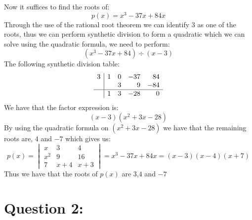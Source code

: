\documentclass{article}
\begin{document}
Now it suffices to find the roots of: $$p(x)=x^{3}-37x+84x$$
Through the use of the rational root theorem we can identify $3$ as one of the roots, thus we can perform synthetic division to form a quadratic which we can solve using the quadratic formula, we need to perform: $$(x^{3}-37x+84) \div (x-3)$$
The following synthetic division table: 
$$\begin{array}{r|rrrr}
3 & 1 & 0 & -37 & 84 \\
  &   & 3 & 9    & -84 \\
\hline
  & 1 & 3 & -28  & 0 \\
\end{array}$$
We have that the factor expression is: $$(x-3)(x^{2}+3x-28)$$
By using the quadratic formula on $(x^{2}+3x-28)$ we have that the remaining roots are, $4$ and $-7$ which gives us: $$p(x)=\begin{vmatrix}
    x&3&4\\
    x^{2}&9&16\\
    7&x+4&x+3
    \end{vmatrix}=x^{3}-37x+84x=(x-3)(x-4)(x+7)$$
    Thus we have that the roots of $p(x)$ are $3$,$4$ and $-7$

\newpage
\section*{Question 2:}
\end{document}
